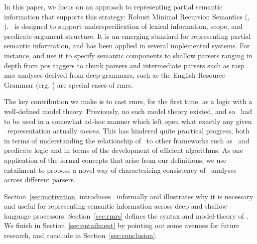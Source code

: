 In this paper, we focus on an approach to representing partial
semantic information that supports this strategy: Robust Minimal
Recursion Semantics (\rmrs, \cite{copestake:2007a,copestake:2007b}).
\rmrs\ is designed to support underspecification of lexical information,
scope, and predicate-argument structure.  It is an emerging standard
for representing partial semantic information, and has been applied in
several implemented systems.  For instance, 
and  use it to specify semantic components to
shallow parsers ranging in depth from {\sc pos} taggers to chunk
parsers and intermediate parsers such as {\sc rasp}
\cite{briscoe:etal:2006}.  {\sc mrs} analyses
\cite{copestake:etal:2005} derived from deep grammars, such as the
English Resource Grammar ({\sc erg}, \cite{copestake:flickinger:2000})
are special cases of {\sc rmrs}.

The key contribution we make is to cast {\sc rmrs}, for the first
time, as a logic with a well-defined model theory.  Previously, no
such model theory existed, and so \rmrs\ had to be used in a somewhat
ad-hoc manner which left open what exactly any given \rmrs\
representation actually \emph{means}.  This has hindered quite
practical progress, both in terms of understanding the relationship of
\rmrs\ to other frameworks such as \mrs\ and predicate logic and in
terms of the development of efficient algorithms.  As one application
of the formal concepts that arise from our definitions, we use
entailment to propose a
novel way of characterising consistency of \rmrs\ analyses across
different parsers.

Section~\ref{sec:motivation} introduces \rmrs\ informally and
illustrates why it is necessary and useful for representing semantic
information across deep and shallow language processors.
Section~\ref{sec:rmrs} defines the syntax and model-theory of \rmrs.
We finish in Section~\ref{sec:entailment} by pointing out some avenues
for future research, and conclude in Section~\ref{sec:conclusion}.


